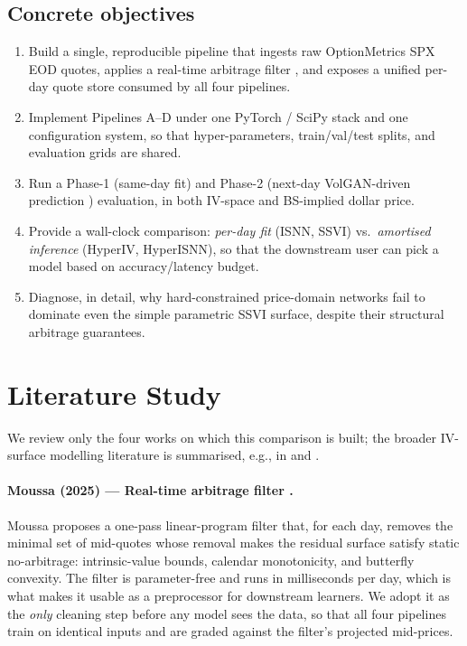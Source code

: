 \documentclass[11pt,a4paper]{article}
\begin{document}
\subsection{Concrete objectives}

\begin{enumerate}[leftmargin=*,itemsep=2pt,topsep=2pt]
  \item Build a single, reproducible pipeline that ingests raw OptionMetrics
        SPX EOD quotes, applies a real-time arbitrage filter
        \citep{moussa2025arbitrage}, and exposes a unified per-day quote
        store consumed by all four pipelines.
  \item Implement Pipelines A--D under one PyTorch / SciPy stack and one
        configuration system, so that hyper-parameters, train/val/test
        splits, and evaluation grids are shared.
  \item Run a Phase-1 (same-day fit) and Phase-2 (next-day VolGAN-driven
        prediction \citep{cont2025volgan}) evaluation, in both IV-space and
        BS-implied dollar price.
  \item Provide a wall-clock comparison: \emph{per-day fit} (ISNN, SSVI)
        vs.\ \emph{amortised inference} (HyperIV, HyperISNN), so that the
        downstream user can pick a model based on accuracy/latency budget.
  \item Diagnose, in detail, why hard-constrained price-domain networks
        fail to dominate even the simple parametric SSVI surface, despite
        their structural arbitrage guarantees.
\end{enumerate}

\section{Literature Study}
\label{sec:lit}

We review only the four works on which this comparison is built; the
broader IV-surface modelling literature is summarised, e.g., in
\citet{ackerer2020deep} and \citet{boursin2024operator}.

\paragraph{Moussa (2025) --- Real-time arbitrage filter
\citep{moussa2025arbitrage}.} Moussa proposes a one-pass linear-program
filter that, for each day, removes the minimal set of mid-quotes whose
removal makes the residual surface satisfy static no-arbitrage:
intrinsic-value bounds, calendar monotonicity, and butterfly convexity. The
filter is parameter-free and runs in milliseconds per day, which is what
makes it usable as a preprocessor for downstream learners. We adopt it
as the \emph{only} cleaning step before any model sees the data, so that
all four pipelines train on identical inputs and are graded against the
filter's projected mid-prices.
\end{document}
